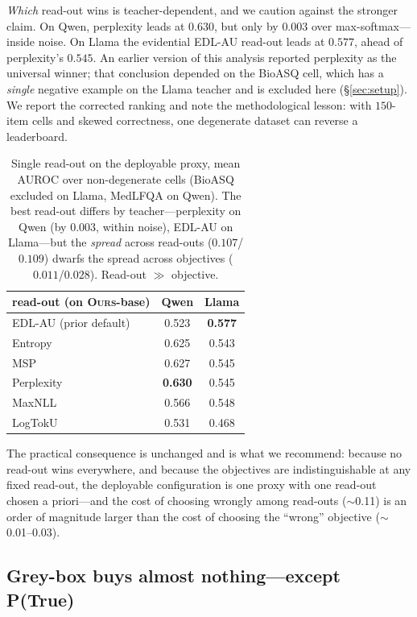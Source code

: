 \documentclass[11pt]{article}
\newcommand{\ours}{\textsc{Ours}}
\newcommand{\best}[1]{\textbf{#1}}
\begin{document}
\emph{Which} read-out wins is teacher-dependent, and we caution against the stronger claim.
On Qwen, perplexity leads at $0.630$, but only by $0.003$ over max-softmax---inside noise. On
Llama the evidential EDL-AU read-out leads at $0.577$, ahead of perplexity's $0.545$. An
earlier version of this analysis reported perplexity as the universal winner; that conclusion
depended on the BioASQ cell, which has a \emph{single} negative example on the Llama teacher
and is excluded here (\S\ref{sec:setup}). We report the corrected ranking and note the
methodological lesson: with $150$-item cells and skewed correctness, one degenerate dataset can
reverse a leaderboard.

\begin{table}[t]\centering\small
\begin{tabular}{l cc}
\toprule
read-out (on \ours-base) & Qwen & Llama\\
\midrule
EDL-AU (prior default)   & 0.523 & \best{0.577}\\
Entropy                  & 0.625 & 0.543\\
MSP                      & 0.627 & 0.545\\
Perplexity               & \best{0.630} & 0.545\\
MaxNLL                   & 0.566 & 0.548\\
LogTokU                  & 0.531 & 0.468\\
\bottomrule
\end{tabular}
\caption{Single read-out on the deployable proxy, mean AUROC over non-degenerate cells
(BioASQ excluded on Llama, MedLFQA on Qwen). The best read-out differs by teacher---perplexity
on Qwen (by $0.003$, within noise), EDL-AU on Llama---but the \emph{spread} across read-outs
($0.107$/$0.109$) dwarfs the spread across objectives ($0.011$/$0.028$). Read-out $\gg$
objective.}
\label{tab:readout}
\end{table}

The practical consequence is unchanged and is what we recommend: because no read-out wins
everywhere, and because the objectives are indistinguishable at any fixed read-out, the
deployable configuration is one proxy with one read-out chosen a priori---and the cost of
choosing wrongly among read-outs ($\sim$0.11) is an order of magnitude larger than the cost of
choosing the ``wrong'' objective ($\sim$0.01--0.03).

\subsection{Grey-box buys almost nothing---except P(True)}\label{sec:greybox}
\end{document}
